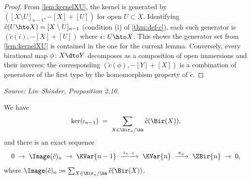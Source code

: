 \begin{proof}
  From \cref{lem:kernelXU}, the kernel is generated by \(([X \setminus U]_{n-1}, -[X]+[U])\)
  for open \(U \subset X\).  Identifying \(\tilde{c}(U \hto X) = [X \setminus U]_{n-1}\)
  (condition (i) of \cref{thm:def-c}), each such generator is
  \((\tilde{c}(i), -[X]+[U])\) where \(i \colon U \hto X\).  This shows the
  generator set from \cref{lem:kernelXU} is contained in the one for the current lemma.
  Conversely, every birational map \(\phi \colon X \dto Y\) decomposes as a
  composition of open immersions and their inverses; the corresponding
  \((\tilde{c}(\phi), -[Y]+[X])\) is a combination of generators of the first type
  by the homomorphism property of \(\tilde{c}\).
\end{proof}

\begin{proposition}
  \label{prop:ker-iota}
  \textit{Source: Lin--Shinder, Proposition 2.10.}

  We have
  \[
    \ker(\iota_{n-1}) \;=\; \sum_{X \in \Bir_n/\bk} \tilde{c}(\Bir(X)),
  \]
  and there is an exact sequence
  \[
    0 \;\to\; \Image(\tilde{c})_n \;\to\; \KVar{n-1}
      \;\xrightarrow{\;\iota_{n-1}\;}\; \KVar{n}
      \;\xrightarrow{\;\pi_n\;}\; \ZBir{n} \;\to\; 0,
  \]
  where \(\Image(\tilde{c})_n := \sum_{X \in \Bir_n/\bk} \tilde{c}(\Bir(X))\).
\end{proposition}
